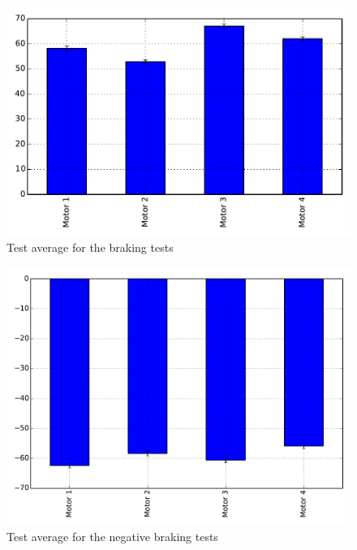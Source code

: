 \begin{figure}[ht]
  \includegraphics[scale=0.8]{graphics/test_graphs/Break_barplot.pdf}
  \caption{Test average for the braking tests}
  \centering
  \label{fig:td_brake}
\end{figure}

\begin{figure}[ht]
  \includegraphics[scale=0.8]{graphics/test_graphs/Break_negative_barplot.pdf}
  \caption{Test average for the negative braking tests}
  \centering
  \label{fig:td_negative_brake}
\end{figure}
